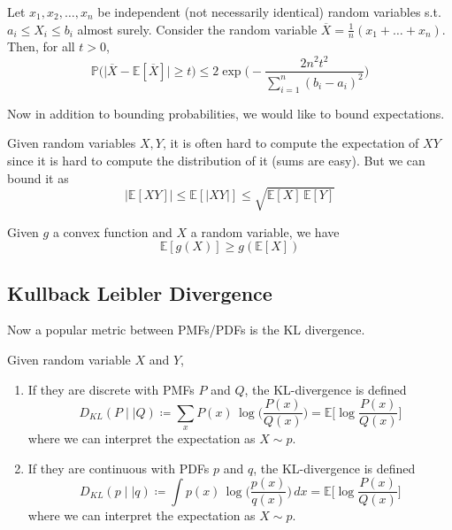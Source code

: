 \documentclass{article}
\begin{document}
    \begin{theorem}
    Let $x_1, x_2, \ldots, x_n$ be independent (not necessarily identical) random variables s.t. $a_i \leq X_i \leq b_i$ almost surely. Consider the random variable $\overline{X} = \frac{1}{n} (x_1 + \ldots + x_n)$. Then, for all $t > 0$, 
    \[\mathbb{P}\big( \big| \overline{X} - \mathbb{E}[\overline{X}] \big| \geq t \big) \leq 2 \exp \bigg( -\frac{2 n^2 t^2}{\sum_{i=1}^n (b_i - a_i)^2} \bigg)\]
    \end{theorem}

    Now in addition to bounding probabilities, we would like to bound expectations. 

    \begin{theorem}
    Given random variables $X, Y$, it is often hard to compute the expectation of $X Y$ since it is hard to compute the distribution of it (sums are easy). But we can bound it as 
    \[|\mathbb{E}[XY]| \leq \mathbb{E}[ |XY| ] \leq \sqrt{\mathbb{E}[X] \, \mathbb{E}[Y]}\]
    \end{theorem}

    \begin{theorem}
    Given $g$ a convex function and $X$ a random variable, we have 
    \[\mathbb{E}[ g(X)] \geq g (\mathbb{E}[X])\]
    \end{theorem}

    \subsection{Kullback Leibler Divergence}

    Now a popular metric between PMFs/PDFs is the KL divergence. 

    \begin{definition}
    Given random variable $X$ and $Y$, 
    \begin{enumerate}
        \item If they are discrete with PMFs $P$ and $Q$, the KL-divergence is defined 
        \[D_{KL} (P \mid\mid Q) \coloneqq \sum_{x} P(x) \, \log \bigg(\frac{P(x)}{Q(x)} \bigg) = \mathbb{E} \bigg[ \log \frac{P(x)}{Q(x)} \bigg] \]
        where we can interpret the expectation as $X \sim p$. 
        \item If they are continuous with PDFs $p$ and $q$, the KL-divergence is defined 
        \[D_{KL} (p \mid\mid q) \coloneqq \int p(x) \, \log \bigg( \frac{p(x)}{q(x)} \bigg)\,dx = \mathbb{E} \bigg[ \log \frac{P(x)}{Q(x)} \bigg] \]
        where we can interpret the expectation as $X \sim p$. 
    \end{enumerate}
    \end{definition}
\end{document}
